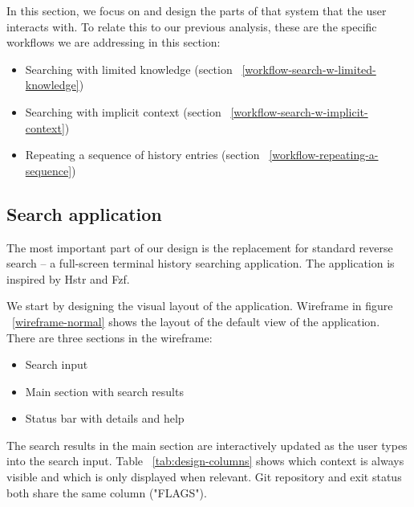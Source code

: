 \documentclass[thesis=M,english]{FITthesis}[2012/10/20]
\let\myRef\ref
\renewcommand\ref{\unskip~\myRef}
\begin{document}
In this section, we focus on and design the parts of that system that the user interacts with. 
To relate this to our previous analysis, these are the specific workflows we are addressing in this section:

\begin{itemize}
    \item Searching with limited knowledge (section \ref{workflow-search-w-limited-knowledge})
    \item Searching with implicit context (section \ref{workflow-search-w-implicit-context})
    \item Repeating a sequence of history entries (section \ref{workflow-repeating-a-sequence})
\end{itemize}

\subsection{Search application}

The most important part of our design is the replacement for standard reverse search -- a full-screen terminal history searching application. The application is inspired by Hstr and Fzf. 

We start by designing the visual layout of the application.
Wireframe in figure \ref{wireframe-normal} shows the layout of the default view of the application. There are three sections in the wireframe:

\begin{itemize}
    \item Search input
    \item Main section with search results
    \item Status bar with details and help
\end{itemize}




The search results in the main section are interactively updated as the user types into the search input. Table \ref{tab:design-columns} shows which context is always visible and which is only displayed when relevant. Git repository and exit status both share the same column ("FLAGS").  
\end{document}
